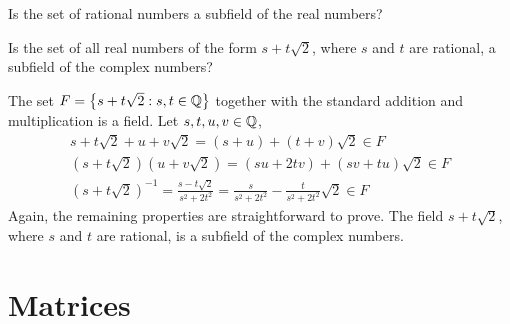 \begin{problem} \label{problem:RationalNumbers}
Is the set of rational numbers a subfield of the real numbers?
\end{problem}

\begin{example}
Is the set of all real numbers of the form $s + t \sqrt{2}$, where $s$ and $t$ are rational, a subfield of the complex numbers?

The set $F = \left\{ s + t \sqrt{2} : s, t \in \mathbb{Q} \right\}$ together with the standard addition and multiplication is a field.
Let $s, t, u, v \in \mathbb{Q}$,
\begin{gather*}
s + t \sqrt{2} + u + v \sqrt{2} = (s+u) + (t+v) \sqrt{2} \in F \\
\left( s + t \sqrt{2} \right) \left( u + v \sqrt{2} \right) = (su + 2 tv) + (sv + tu) \sqrt{2} \in F \\
\left( s + t \sqrt{2} \right)^{-1} = \frac{ s - t \sqrt{2} }{ s^2 + 2 t^2 }
= \frac{ s }{ s^2 + 2 t^2 } - \frac{ t }{ s^2 + 2 t^2 } \sqrt{2} \in F
\end{gather*}
Again, the remaining properties are straightforward to prove.
The field $s + t \sqrt{2}$, where $s$ and $t$ are rational, is a subfield of the complex numbers.
\end{example}


\section{Matrices}

